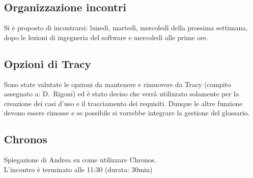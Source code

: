 \documentclass[11pt]{meetingmins}
\begin{document}
\subsection{Organizzazione incontri}

Si \`{e} proposto di incontrarsi: luned\`{i}, marted\`{i}, mercoled\`{i} della prossima settimana, dopo le lezioni di ingegneria del software e mercoled\`{i} alle prime ore.\\

\subsection{Opzioni di Tracy}

Sono state valutate le opzioni da mantenere e rimuovere da Tracy (compito assegnato a: D.~Rigoni) ed è stato deciso che verrà utilizzato solamente per la creazione dei casi d'uso e il tracciamento dei requisiti. Dunque le altre funzione devono essere rimosse e se possibile si vorrebbe integrare la gestione del glossario.


\subsection{Chronos}

Spiegazione di Andrea su come utilizzare Chronos.\\

L'incontro è terminato alle 11:30 (durata: 30min)\\

\end{document}
